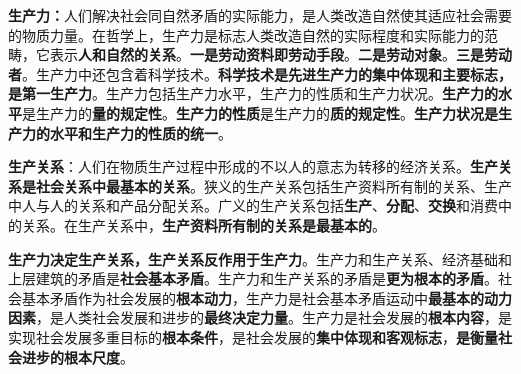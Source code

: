 \textbf{{生产力}：}人们解决社会同自然矛盾的实际能力，是人类改造自然使其适应社会需要的物质力量。在哲学上，生产力是标志人类改造自然的实际程度和实际能力的范畴，它表示\textbf{{人和自然的关系}}。\textbf{{一是劳动资料即劳动手段}}。\textbf{{二是劳动对象}}。\textbf{{三是劳动者}}。生产力中还包含着科学技术。\textbf{{科学技术是先进生产力的集中体现和主要标志，是第一生产力}}。{生产力包括生产力水平，生产力的性质和生产力状况。}\textbf{{生产力的水平}}是生产力的\textbf{{量的规定性}}。\textbf{{生产力的性质}}是生产力的\textbf{{质的规定性}}。\textbf{{生产力状况是生产力的水平和生产力的性质的统一}}。

\textbf{{生产关系}}：人们在物质生产过程中形成的不以人的意志为转移的经济关系。\textbf{{生产关系是社会关系中最基本的关系}}。狭义的生产关系包括生产资料所有制的关系、生产中人与人的关系和产品分配关系。广义的生产关系包括\textbf{{生产}}、\textbf{{分配}}、\textbf{{交换}}和消费中的关系。在生产关系中，\textbf{{生产资料所有制的关系是最基本的}}。

\textbf{{生产力决定生产关系，生产关系反作用于生产力}}{。生产力和生产关系、经济基础和上层建筑的矛盾是}\textbf{{社会基本矛盾}}{。生产力和生产关系的矛盾是}\textbf{{更为根本的矛盾}}{。社会基本矛盾作为社会发展的}\textbf{{根本动力}}{，生产力是社会基本矛盾运动中}\textbf{{{最基本的动力因素}}}{{}，是人类社会发展和进步的}\textbf{{{最终决定力量}}}{。生产力是社会发展的}\textbf{{根本内容}}{，是实现社会发展多重目标的}\textbf{{{根本条件}}}{，是社会发展的}\textbf{{{集中体现和客观标志}}}{，}\textbf{{{是衡量社会进步的根本尺度}}}{。}

